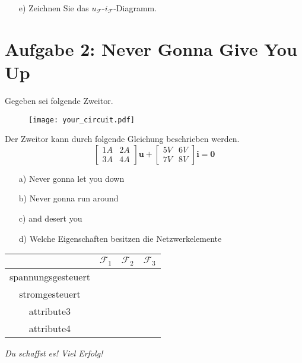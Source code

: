\documentclass[a4paper,12pt]{article}
\begin{document}
    \begin{itemize}
        \item[e)] Zeichnen Sie das $u_{\mathcal{F}}$-$i_{\mathcal{F}}$-Diagramm.
    \end{itemize}

    \newpage
    
    \section*{Aufgabe 2: Never Gonna Give You Up}
    Gegeben sei folgende Zweitor.
    \begin{figure}[ht]
        \centering
        \texttt{[image: your\_circuit.pdf]}
    \end{figure}

Der Zweitor kann durch folgende Gleichung beschrieben werden.
    \begin{equation*}
    \begin{bmatrix}
    1A & 2A\\
    3A & 4A
    \end{bmatrix} \mathbf{u} +
    \begin{bmatrix}
    5V & 6V\\
    7V & 8V
    \end{bmatrix}  \mathbf{i} = \textbf{0}
    \end{equation*}
    \begin{itemize}
        \item[a)] Never gonna let you down
        \item[b)] Never gonna run around
        \item[c)] and desert you
        \item[d)] Welche Eigenschaften besitzen die Netzwerkelemente
    \end{itemize}

    \begin{center}
    \begin{tabular}{ | c | m{.5cm}| m{.51cm} | m{.5cm}| } 
      \hline
      & $\mathcal{F}_1$ & $\mathcal{F}_{2}$ & $\mathcal{F}_{3}$ \\
      \hline
      spannungsgesteuert & & &  \\ 
      \hline
      stromgesteuert & & &  \\ 
      \hline
      attribute3 & & &  \\ 
      \hline
      attribute4 & & &  \\ 
      \hline
    \end{tabular}
    \end{center}
    \textit{Du schaffst es! Viel Erfolg!}
\end{document}
